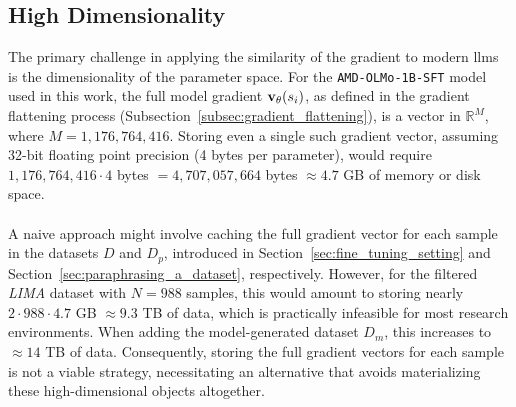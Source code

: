 \subsection{High Dimensionality}\label{subsec:high_dimensionality}
The primary challenge in applying the similarity of the gradient to modern \acrlong{llm}s is the dimensionality of the parameter space. For the \texttt{AMD-OLMo-1B-SFT} model used in this work, the full model gradient $\vXsi[\theta]$, as defined in the gradient flattening process (Subsection~\ref{subsec:gradient_flattening}), is a vector in $\mathbb{R}^{M}$, where $M = 1{,}176{,}764{,}416$. Storing even a single such gradient vector, assuming 32-bit floating point precision (4 bytes per parameter), would require $1{,}176{,}764{,}416 \cdot 4$ bytes $= 4{,}707{,}057{,}664$ bytes $\approx 4.7$ GB of memory or disk space.
\\\\
A naive approach might involve caching the full gradient vector for each sample in the datasets $D$ and $D_p$, introduced in Section~\ref{sec:fine_tuning_setting} and Section~\ref{sec:paraphrasing_a_dataset}, respectively. However, for the filtered \emph{LIMA} dataset with $N=988$ samples, this would amount to storing nearly $2 \cdot 988 \cdot 4.7$ GB $\approx 9.3$ TB of data, which is practically infeasible for most research environments. When adding the model-generated dataset $D_m$, this increases to $\approx 14$ TB of data. Consequently, storing the full gradient vectors for each sample is not a viable strategy, necessitating an alternative that avoids materializing these high-dimensional objects altogether.

